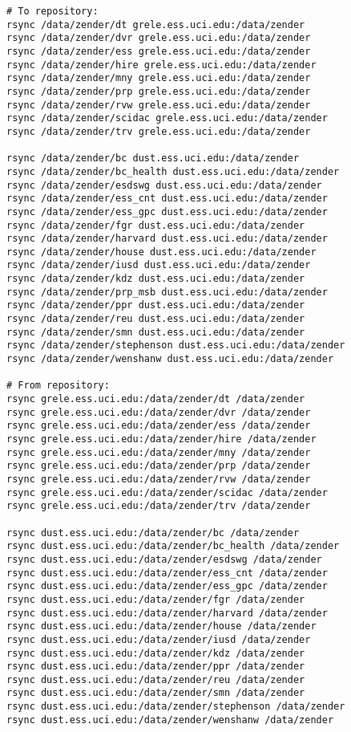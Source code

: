 \documentclass[12pt,twoside]{article}
\begin{document}
\begin{verbatim}
# To repository:
rsync /data/zender/dt grele.ess.uci.edu:/data/zender
rsync /data/zender/dvr grele.ess.uci.edu:/data/zender
rsync /data/zender/ess grele.ess.uci.edu:/data/zender
rsync /data/zender/hire grele.ess.uci.edu:/data/zender
rsync /data/zender/mny grele.ess.uci.edu:/data/zender
rsync /data/zender/prp grele.ess.uci.edu:/data/zender
rsync /data/zender/rvw grele.ess.uci.edu:/data/zender
rsync /data/zender/scidac grele.ess.uci.edu:/data/zender
rsync /data/zender/trv grele.ess.uci.edu:/data/zender

rsync /data/zender/bc dust.ess.uci.edu:/data/zender
rsync /data/zender/bc_health dust.ess.uci.edu:/data/zender
rsync /data/zender/esdswg dust.ess.uci.edu:/data/zender
rsync /data/zender/ess_cnt dust.ess.uci.edu:/data/zender
rsync /data/zender/ess_gpc dust.ess.uci.edu:/data/zender
rsync /data/zender/fgr dust.ess.uci.edu:/data/zender
rsync /data/zender/harvard dust.ess.uci.edu:/data/zender
rsync /data/zender/house dust.ess.uci.edu:/data/zender
rsync /data/zender/iusd dust.ess.uci.edu:/data/zender
rsync /data/zender/kdz dust.ess.uci.edu:/data/zender
rsync /data/zender/prp_msb dust.ess.uci.edu:/data/zender
rsync /data/zender/ppr dust.ess.uci.edu:/data/zender
rsync /data/zender/reu dust.ess.uci.edu:/data/zender
rsync /data/zender/smn dust.ess.uci.edu:/data/zender
rsync /data/zender/stephenson dust.ess.uci.edu:/data/zender
rsync /data/zender/wenshanw dust.ess.uci.edu:/data/zender

# From repository:
rsync grele.ess.uci.edu:/data/zender/dt /data/zender
rsync grele.ess.uci.edu:/data/zender/dvr /data/zender
rsync grele.ess.uci.edu:/data/zender/ess /data/zender
rsync grele.ess.uci.edu:/data/zender/hire /data/zender
rsync grele.ess.uci.edu:/data/zender/mny /data/zender
rsync grele.ess.uci.edu:/data/zender/prp /data/zender
rsync grele.ess.uci.edu:/data/zender/rvw /data/zender
rsync grele.ess.uci.edu:/data/zender/scidac /data/zender
rsync grele.ess.uci.edu:/data/zender/trv /data/zender

rsync dust.ess.uci.edu:/data/zender/bc /data/zender
rsync dust.ess.uci.edu:/data/zender/bc_health /data/zender
rsync dust.ess.uci.edu:/data/zender/esdswg /data/zender
rsync dust.ess.uci.edu:/data/zender/ess_cnt /data/zender
rsync dust.ess.uci.edu:/data/zender/ess_gpc /data/zender
rsync dust.ess.uci.edu:/data/zender/fgr /data/zender
rsync dust.ess.uci.edu:/data/zender/harvard /data/zender
rsync dust.ess.uci.edu:/data/zender/house /data/zender
rsync dust.ess.uci.edu:/data/zender/iusd /data/zender
rsync dust.ess.uci.edu:/data/zender/kdz /data/zender
rsync dust.ess.uci.edu:/data/zender/ppr /data/zender
rsync dust.ess.uci.edu:/data/zender/reu /data/zender
rsync dust.ess.uci.edu:/data/zender/smn /data/zender
rsync dust.ess.uci.edu:/data/zender/stephenson /data/zender
rsync dust.ess.uci.edu:/data/zender/wenshanw /data/zender
\end{verbatim}
\end{document}
